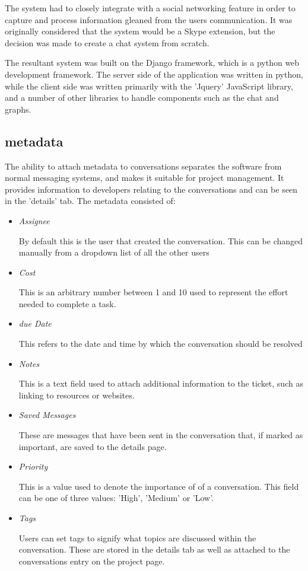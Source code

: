 \documentclass{l4proj}
\begin{document}
The system had to closely integrate with a social networking feature in order to capture and process information gleaned from the users communication.  It was originally considered that the system would be a Skype extension, but the decision was made to create a chat system from scratch. 

The resultant system was built on the Django framework, which is a python web development framework.  The server side of the application was written in python, while the client side was written primarily with the 'Jquery' JavaScript library, and a number of other libraries to handle components such as the chat and graphs. 

\subsection{metadata}
The ability to attach metadata to conversations separates the software from normal messaging systems, and makes it suitable for project management.  It provides information to developers relating to the conversations and can be seen in the 'details' tab.  The metadata consisted of:

\begin{itemize}
\item \textit{Assignee} 
\par By default this is the user that created the conversation.  This can be changed manually from a dropdown list of all the other users
\item \textit{Cost}
\par This is an arbitrary number between 1 and 10 used to represent the effort needed to complete a task. 
\item \textit{due Date}
\par This refers to the date and time by which the conversation should be resolved
\item \textit{Notes}
\par This is a text field used to attach additional information to the ticket, such as linking to resources or websites. 
\item \textit{Saved Messages}
\par These are messages that have been sent in the conversation that, if marked as important, are saved to the details page. 
\item \textit{Priority}
\par This is a value used to denote the importance of of a conversation.  This field can be one of three values: 'High', 'Medium' or 'Low'.
\item \textit{Tags} 
\par Users can set tags to signify what topics are discussed within the conversation.  These are stored in the details tab as well as attached to the conversations entry on the project page.
\end{itemize}
\end{document}
